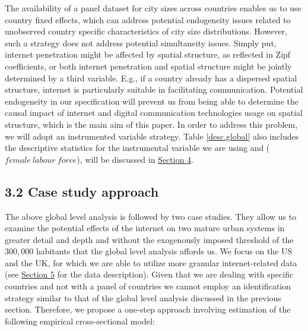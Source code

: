 \documentclass[10pt,letterpaper]{article}
\begin{document}
\color{black}

\begin{table}

\caption{\label{tab:unnamed-chunk-4}Correlations between ICT variables\label{cor}}
\end{table}

The availability of a panel dataset for city sizes across countries
enables us to use country fixed effects, which can address potential
endogeneity issues related to unobserved country specific
characteristics of city size distributions. However, such a strategy
does not address potential simultaneity issues. Simply put, internet
penetration might be affected by spatial structure, as reflected in Zipf
coefficients, or both internet penetration and spatial structure might
be jointly determined by a third variable. E.g., if a country already
has a dispersed spatial structure, internet is particularly suitable in
facilitating communication. Potential endogeneity in our specification
will prevent us from being able to determine the causal impact of
internet and digital communication technologies usage on spatial
structure, which is the main aim of this paper. In order to address this
problem, we will adopt an instrumented variable strategy. Table
\ref{desc.global} also includes the descriptive statistics for the
instrumental variable we are using and (\(female\:labour\:force\)), will
be discussed in \protect\hyperlink{sec4}{Section 4}.

\hypertarget{sec3.2}{%
\subsection{3.2 Case study approach}\label{sec3.2}}

The above global level analysis is followed by two case studies. They
allow us to examine the potential effects of the internet on two mature
urban systems in greater detail and depth and without the exogenously
imposed threshold of the \(300,000\) habitants that the global level
analysis affords us. We focus on the US and the UK, for which we are
able to utilize more granular internet-related data (see
\protect\hyperlink{sec5}{Section 5} for the data description). Given
that we are dealing with specific countries and not with a panel of
countries we cannot employ an identification strategy similar to that of
the global level analysis discussed in the previous section. Therefore,
we propose a one-step approach involving estimation of the following
empirical cross-sectional model:
\end{document}
